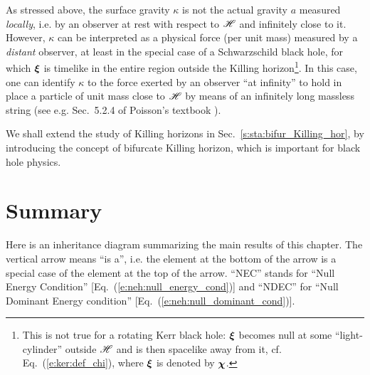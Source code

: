 \begin{remark}
As stressed above, the surface gravity $\kappa$ is not the
actual gravity $a$ measured \emph{locally}, i.e. by an observer at rest with
respect to $\mathscr{H}$ and infinitely close to it. However, $\kappa$ can be interpreted
as a physical force (per unit mass) measured by a \emph{distant} observer,
at least in the special case of a Schwarzschild black hole, for which
$\bm{\xi}$ is timelike in the entire region outside the Killing horizon\footnote{This is not true for a rotating Kerr black hole:
$\bm{\xi}$ becomes null at some ``light-cylinder'' outside $\mathscr{H}$ and is then
spacelike away from it, cf. Eq.~(\ref{e:ker:def_chi}),
where $\bm{\xi}$ is denoted by $\bm{\chi}$.}. In this case, one can identify $\kappa$
to the force exerted by an observer ``at infinity'' to hold in place a particle
of unit mass close to $\mathscr{H}$ by means of an infinitely long massless string
(see e.g. Sec.~5.2.4 of Poisson's textbook \cite{Poiss04}).
\end{remark}

\begin{remark}
We shall extend the study of Killing horizons in Sec.~\ref{s:sta:bifur_Killing_hor},
by introducing the concept of bifurcate Killing horizon, which is important
for black hole physics.
\end{remark}


\section{Summary}

Here is an inheritance diagram summarizing the main results of this chapter.
The vertical arrow means ``is a'', i.e. the element at the bottom of the arrow
is a special case of the element at the top of the arrow.
``NEC'' stands for ``Null Energy Condition'' [Eq.~(\ref{e:neh:null_energy_cond})]
and ``NDEC'' for ``Null Dominant Energy condition'' [Eq.~(\ref{e:neh:null_dominant_cond})].

